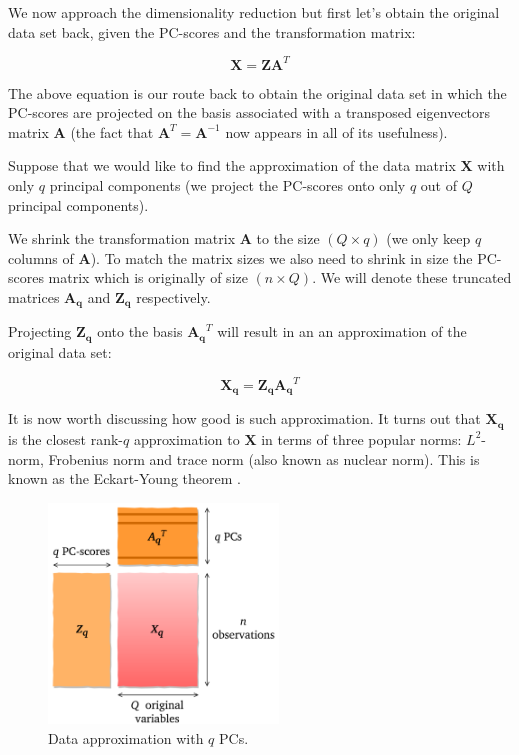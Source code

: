 \documentclass[10pt,twocolumn]{article}
\begin{document}
We now approach the dimensionality reduction but first let's obtain the original data set back, given the PC-scores and the transformation matrix:

\begin{equation} \label{eq:X-retrieval}
\bm{X} = \bm{Z} \bm{A}^T
\end{equation}

The above equation is our route back to obtain the original data set in which the PC-scores are projected on the basis associated with a transposed eigenvectors matrix $\bm{A}$ (the fact that $\bm{A}^T = \bm{A}^{-1}$ now appears in all  of its usefulness).

Suppose that we would like to find the approximation of the data matrix $\bm{X}$ with only $q$ principal components (we project the PC-scores onto only $q$ out of $Q$ principal components).

We shrink the transformation matrix $\bm{A}$ to the size $(Q \times q)$ (we only keep $q$ columns of $\bm{A}$). To match the matrix sizes we also need to shrink in size the PC-scores matrix which is originally of size $(n \times Q)$. We will denote these truncated matrices $\bm{A_q}$ and $\bm{Z_q}$ respectively.



Projecting $\bm{Z_q}$ onto the basis $\bm{A_q}^T$ will result in an an approximation of the original data set:

\begin{equation} \label{eq:X-approximation}
\bm{X_q} = \bm{Z_q} \bm{A_q}^T
\end{equation}

It is now worth discussing how good is such approximation. It turns out that $\bm{X_q}$ is the closest rank-$q$ approximation to $\bm{X}$ in terms of three popular norms: $L^2$-norm, Frobenius norm and trace norm (also known as nuclear norm). This is known as the Eckart-Young theorem \cite{eckart-young}.

\begin{figure}[H]
\centering\includegraphics[width=6.1cm]{data-approx.png}
\caption{Data approximation with $q$ PCs.}
\label{fig:data-approx}
\end{figure}
\end{document}
